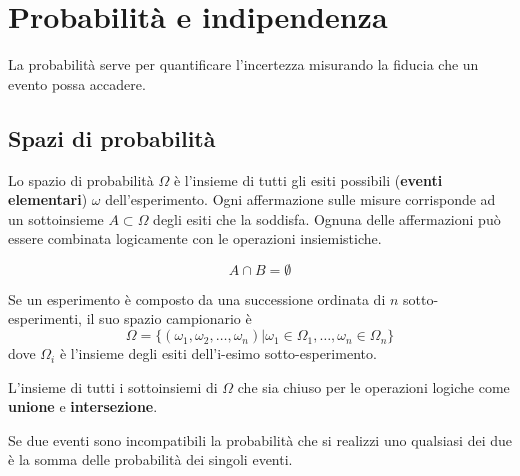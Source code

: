\newpage
\section{Probabilità e indipendenza}
La probabilità serve per quantificare l'incertezza misurando la fiducia che un evento possa accadere.
\subsection{Spazi di probabilità}
\begin{definition}
	Lo spazio di probabilità $\Omega$ è l'insieme di tutti gli esiti possibili (\textbf{eventi elementari}) $\omega$ dell'esperimento. Ogni affermazione sulle misure corrisponde ad un sottoinsieme $A \subset \Omega$ degli esiti che la soddisfa. Ognuna delle affermazioni può essere combinata logicamente con le operazioni insiemistiche.
\end{definition}
\begin{definition}
	\begin{equation}
		A \cap B = \emptyset
	\end{equation}
\end{definition}
\begin{definition}
	Se un esperimento è composto da una successione ordinata di $n$ sotto-esperimenti, il suo spazio campionario è
	\begin{equation}
		\Omega = \{(\omega_1, \omega_2, \ldots, \omega_n) \vert \omega_1 \in \Omega_1, \ldots, \omega_n \in \Omega_n\}
	\end{equation}
	dove $\Omega_i$ è l'insieme degli esiti dell'i-esimo sotto-esperimento.
\end{definition}
\begin{definition}
	L'insieme di tutti i sottoinsiemi di $\Omega$ che sia chiuso per le operazioni logiche come \textbf{unione} e \textbf{intersezione}.
\end{definition}
\begin{observation}
	Se due eventi sono incompatibili la probabilità che si realizzi uno qualsiasi dei due è la somma delle probabilità dei singoli eventi.
\end{observation}
